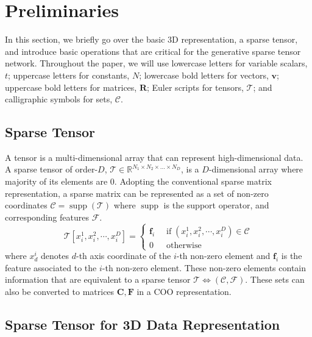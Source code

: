 \documentclass[runningheads]{llncs}
\DeclareMathOperator\supp{supp}
\begin{document}
%
 \section{Preliminaries}

In this section, we briefly go over the basic 3D representation, a sparse tensor, and introduce basic operations that are critical for the generative sparse tensor network. Throughout the paper, we will use lowercase letters for variable scalars, $t$; uppercase letters for constants, $N$; lowercase bold letters for vectors, $\mathbf{v}$; uppercase bold letters for matrices, $\mathbf{R}$; Euler scripts for tensors, $\mathscr{T}$; and calligraphic symbols for sets, $\mathcal{C}$.



 
\subsection{Sparse Tensor}

A tensor is a multi-dimensional array that can represent high-dimensional data. A sparse tensor of order-$D$, $\mathscr{T} \in \mathbb{R}^{N_1 \times N_2 \times ... \times N_D}$, is a $D$-dimensional array where majority of its elements are 0. Adopting the conventional sparse matrix representation, a sparse matrix can be represented as a set of non-zero coordinates $\mathcal{C} = \supp(\mathscr{T})$ where $\supp$ is the support operator, and corresponding features $\mathcal{F}$.
\begin{equation}
   \mathscr{T}[x^1_i,  x^2_i,  \cdots, x^D_i] = \begin{cases}
      \mathbf{f}_i \;\; & \text{if} \; (x^1_i,  x^2_i, \cdots, x^D_i) \in \mathcal{C} \\
      0   \;\; & \text{otherwise}
   \end{cases}
\end{equation}
where $x_d^i$ denotes $d$-th axis coordinate of the $i$-th non-zero element and $\mathbf{f}_i$ is the feature associated to the $i$-th non-zero element. These non-zero elements contain information that are equivalent to a sparse tensor $\mathcal{T} \Leftrightarrow (\mathcal{C}, \mathcal{F})$. These sets can also be converted to matrices $\mathbf{C}, \mathbf{F}$ in a COO representation.











\subsection{Sparse Tensor for 3D Data Representation}
\end{document}

